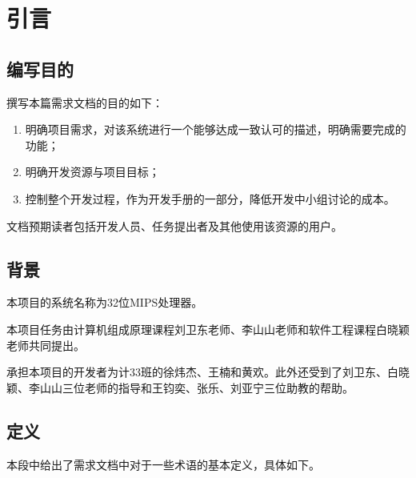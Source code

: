 \newpage
\section{引言}
\subsection{编写目的}
撰写本篇需求文档的目的如下：
\begin{enumerate}
	\item 明确项目需求，对该系统进行一个能够达成一致认可的描述，明确需要完成的功能；
	\item 明确开发资源与项目目标；
	\item 控制整个开发过程，作为开发手册的一部分，降低开发中小组讨论的成本。
\end{enumerate}

文档预期读者包括开发人员、任务提出者及其他使用该资源的用户。
\subsection{背景}
本项目的系统名称为32位MIPS处理器。

本项目任务由计算机组成原理课程刘卫东老师、李山山老师和软件工程课程白晓颖老师共同提出。

承担本项目的开发者为计33班的徐炜杰、王楠和黄欢。此外还受到了刘卫东、白晓颖、李山山三位老师的指导和王钧奕、张乐、刘亚宁三位助教的帮助。
\subsection{定义}
本段中给出了需求文档中对于一些术语的基本定义，具体如下。

